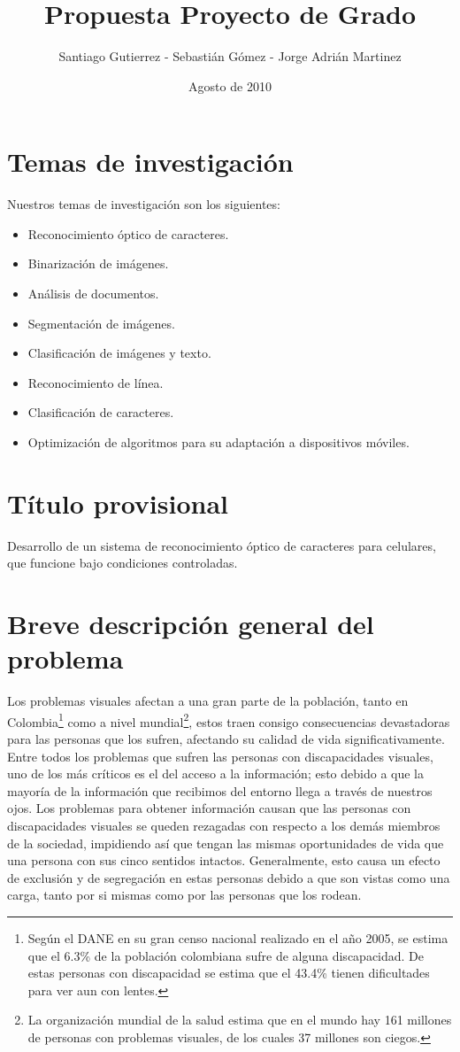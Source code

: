 \documentclass[a4paper, 11pt, oneside]{article}
\begin{document}
\title {Propuesta Proyecto de Grado}
\author { Santiago Gutierrez - Sebastián Gómez - Jorge Adrián Martinez }
\date {Agosto de 2010}
\maketitle
	
	\clearpage
	\section{Temas de investigación}
   Nuestros temas de investigación son los siguientes:
	\begin{itemize}
   \item Reconocimiento óptico de caracteres.
   \item Binarización de imágenes.
   \item Análisis de documentos.
   \item Segmentación de imágenes.
   \item Clasificación de imágenes y texto.
   \item Reconocimiento de línea.
   \item Clasificación de caracteres.
	\item Optimización de algoritmos para su adaptación a dispositivos móviles.
	\end{itemize}
	\clearpage
	\section{Título provisional}
	Desarrollo de un sistema de reconocimiento óptico de caracteres para celulares, que funcione bajo condiciones controladas.
	\clearpage
	\section{Breve descripción general del problema}
	Los problemas visuales afectan a una gran parte de la población, tanto en Colombia\footnote{Según el DANE en su gran censo nacional realizado en el año 2005, se estima que el 6.3\% de la población colombiana sufre de alguna discapacidad. De estas personas con discapacidad se estima que el 43.4\% tienen dificultades para ver aun con lentes.} como a nivel mundial\footnote{La organización mundial de la salud estima que en el mundo hay 161 millones de personas con problemas visuales, de los cuales 37 millones son ciegos.}, estos traen consigo consecuencias devastadoras para las personas que los sufren, afectando su calidad de vida significativamente. Entre todos los problemas que sufren las personas con discapacidades visuales, uno de los más críticos es el del acceso a la información; esto debido a que la mayoría de la información que recibimos del entorno llega a través de nuestros ojos. Los problemas para obtener información causan que las personas con discapacidades visuales se queden rezagadas con respecto a los demás miembros de la sociedad, impidiendo así que tengan las mismas oportunidades de vida que una persona con sus cinco sentidos intactos. Generalmente, esto causa un efecto de exclusión y de segregación en estas personas debido a que son vistas como una carga, tanto por si mismas como por las personas que los rodean. 
	
\end{document}
